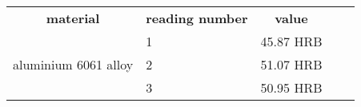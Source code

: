 \documentclass[a4paper, 11pt]{article}
\begin{document}
\begin{center}
\def\arraystretch{1.5}
\begin{tabular}{|m{10em}|m{10em}|m{7.5em}|ll}
\cline{1-3}
\multicolumn{1}{|c|}{\textbf{material}}                                           & \multicolumn{1}{c|}{\textbf{reading number}} & \multicolumn{1}{c|}{\textbf{value}} &  &  \\ \cline{1-3}
\multirow{3}{*}{aluminium 6061 alloy}                                             & 1                                            & 45.87 HRB                           &  &  \\ \cline{2-3}
                                                                                  & 2                                            & 51.07 HRB                           &  &  \\ \cline{2-3}
                                                                                  & 3                                            & 50.95 HRB                           &  &  \\ \cline{1-3}
\end{tabular}


\end{center}
\end{document}
